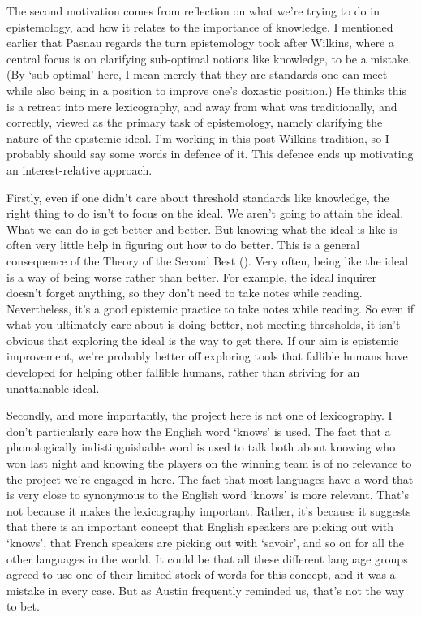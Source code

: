 \documentclass[
  10pt,
  letterpaper,
  twoside]{scrbook}
\begin{document}
The second motivation comes from reflection on what we're trying to do
in epistemology, and how it relates to the importance of knowledge. I
mentioned earlier that Pasnau regards the turn epistemology took after
Wilkins, where a central focus is on clarifying sub-optimal notions like
knowledge, to be a mistake. (By `sub-optimal' here, I mean merely that
they are standards one can meet while also being in a position to
improve one's doxastic position.) He thinks this is a retreat into mere
lexicography, and away from what was traditionally, and correctly,
viewed as the primary task of epistemology, namely clarifying the nature
of the epistemic ideal. I'm working in this post-Wilkins tradition, so I
probably should say some words in defence of it. This defence ends up
motivating an interest-relative approach.

Firstly, even if one didn't care about threshold standards like
knowledge, the right thing to do isn't to focus on the ideal. We aren't
going to attain the ideal. What we can do is get better and better. But
knowing what the ideal is like is often very little help in figuring out
how to do better. This is a general consequence of the Theory of the
Second Best (). Very often, being like the ideal is a way of being worse
rather than better. For example, the ideal inquirer doesn't forget
anything, so they don't need to take notes while reading. Nevertheless,
it's a good epistemic practice to take notes while reading. So even if
what you ultimately care about is doing better, not meeting thresholds,
it isn't obvious that exploring the ideal is the way to get there. If
our aim is epistemic improvement, we're probably better off exploring
tools that fallible humans have developed for helping other fallible
humans, rather than striving for an unattainable ideal.

Secondly, and more importantly, the project here is not one of
lexicography. I don't particularly care how the English word `knows' is
used. The fact that a phonologically indistinguishable word is used to
talk both about knowing who won last night and knowing the players on
the winning team is of no relevance to the project we're engaged in
here. The fact that most languages have a word that is very close to
synonymous to the English word `knows' is more relevant. That's not
because it makes the lexicography important. Rather, it's because it
suggests that there is an important concept that English speakers are
picking out with `knows', that French speakers are picking out with
`savoir', and so on for all the other languages in the world. It could
be that all these different language groups agreed to use one of their
limited stock of words for this concept, and it was a mistake in every
case. But as Austin frequently reminded us, that's not the way to bet.
\end{document}

